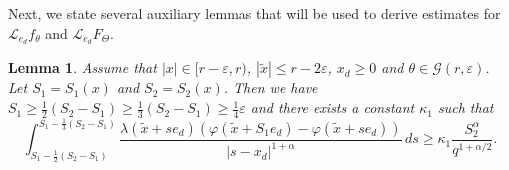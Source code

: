 \documentclass[a4paper,12pt,reqno]{amsart}
\newtheorem{lemma}[theorem]{Lemma}
\theoremstyle{definition}
\theoremstyle{remark}
\newcommand{\eps}{\varepsilon}
\newcommand{\calG}{\mathcal{G}}
\newcommand{\calL}{\mathcal{L}}
\begin{document}

Next, we state several auxiliary lemmas that will be used to derive estimates for $\calL_{e_d} f_{\theta}$ and $\calL_{e_d} F_{\Theta}$.
\begin{lemma}
\label{under_S_1_estimates}
Assume that $|x| \in [r - \eps, r)$, $|\tilde{x}| \le r - 2 \eps$, $x_d \ge 0$ and $\theta \in \calG(r,\eps)$. Let $S_1= S_1(x)$ and $S_2= S_2(x)$. Then we have
$S_1 \ge \frac 12(S_2-S_1)\ge \frac 13(S_2-S_1)\ge \frac14\eps$
and there exists a constant $\kappa_1$ such that
$$
\int_{S_1 -\frac 12(S_2-S_1)}^{S_1 -\frac 13(S_2-S_1)}
\frac{\lambda(\tilde{x} + s e_d) (\varphi(\tilde{x} + S_1 e_d) - \varphi(\tilde{x} + s e_d))}{|s - x_d|^{1 + \alpha}} \, ds 
\ge \kappa_1 \frac{S_2^{\alpha}}{q^{1 + \alpha/2}}.
$$
\end{lemma}
\end{document}
